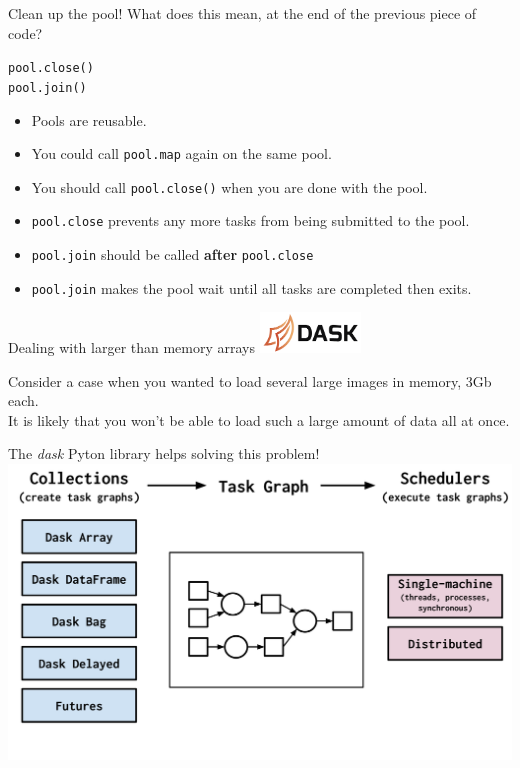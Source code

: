 \documentclass[9pt, aspectratio=169]{beamer}
\begin{document}
\begin{frame}{Clean up the pool!}
	What does this mean, at the end of the previous piece of code?
	\begin{codebox}
		\texttt{pool.close()\\
			pool.join()}
	\end{codebox}
	\pause
	\begin{itemize}
		\item Pools are reusable.
		\item You could call \texttt{pool.map} again on the same pool.
		      \pause
		\item You should call \texttt{pool.close()} when you are done with the pool.
		\item \texttt{pool.close} prevents any more tasks from being submitted to the pool.
		      \pause
		\item \texttt{pool.join} should be called \textbf{after} \texttt{pool.close}
		\item \texttt{pool.join} makes the pool wait until all tasks are completed then exits.
	\end{itemize}
\end{frame}
\begin{frame}
	{Dealing with larger than memory arrays}
	\centering
	\includegraphics[width=0.2\textwidth]{dask.png}

	Consider a case when you wanted to load several large images in memory, 3Gb each. \\
	It is likely that you won't be able to load such a large amount of data all at once.

	The \textit{dask} Pyton library helps solving this problem!\\
	\pause
	\includegraphics[width=.7\textwidth]{dask-overview.png}
\end{frame}
\end{document}
